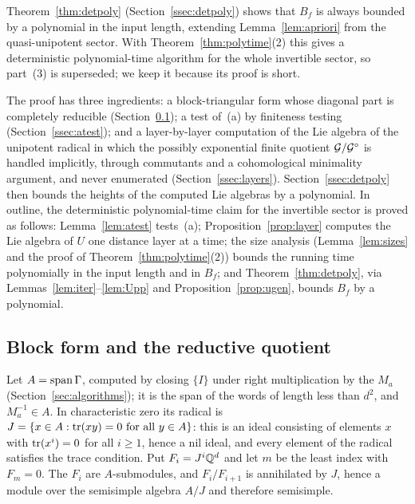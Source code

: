 Theorem~\ref{thm:detpoly} (Section~\ref{ssec:detpoly}) shows that $B_f$ is always bounded by a
polynomial in the input length, extending Lemma~\ref{lem:apriori} from the quasi-unipotent sector.
With Theorem~\ref{thm:polytime}(2) this gives a deterministic polynomial-time algorithm for the
whole invertible sector, so part~(3) is superseded; we keep it because its proof is short.

The proof has three ingredients: a block-triangular form whose diagonal part is completely
reducible (Section~\ref{ssec:block}); a test of~(a) by finiteness testing
(Section~\ref{ssec:atest}); and a layer-by-layer computation of the Lie algebra of the unipotent
radical in which the possibly exponential finite quotient $\mathcal{G}/\mathcal{G}^\circ$ is handled implicitly,
through commutants and a cohomological minimality argument, and never enumerated
(Section~\ref{ssec:layers}). Section~\ref{ssec:detpoly} then bounds the heights of the computed Lie
algebras by a polynomial. In outline, the deterministic polynomial-time claim for the invertible
sector is proved as follows: Lemma~\ref{lem:atest} tests~(a); Proposition~\ref{prop:layer}
computes the Lie algebra of $U$ one distance layer at a time; the size analysis
(Lemma~\ref{lem:sizes} and the proof of Theorem~\ref{thm:polytime}(2))
bounds the running time polynomially in the input length and in $B_f$; and
Theorem~\ref{thm:detpoly}, via Lemmas~\ref{lem:iter}--\ref{lem:Upp} and
Proposition~\ref{prop:ugen}, bounds $B_f$ by a polynomial.

\subsection{Block form and the reductive quotient}\label{ssec:block}
Let $A=\operatorname{span}\Gamma$, computed by closing $\{I\}$ under right multiplication by the $M_a$
(Section~\ref{sec:algorithms}); it is the span of the words of length less than $d^2$, and
$M_a^{-1}\in A$. In characteristic zero its radical is
$J=\{x\in A:\operatorname{tr}(xy)=0\text{ for all }y\in A\}$: this is an ideal consisting of elements $x$ with
$\operatorname{tr}(x^i)=0$ for all $i\ge1$, hence a nil ideal, and every element of the radical satisfies the
trace condition. Put $F_i=J^i\mathbb{Q}^d$ and let $m$ be the least index with $F_m=0$. The $F_i$ are
$A$-submodules, and $F_i/F_{i+1}$ is annihilated by $J$, hence a module over the semisimple
algebra $A/J$ and therefore semisimple.

